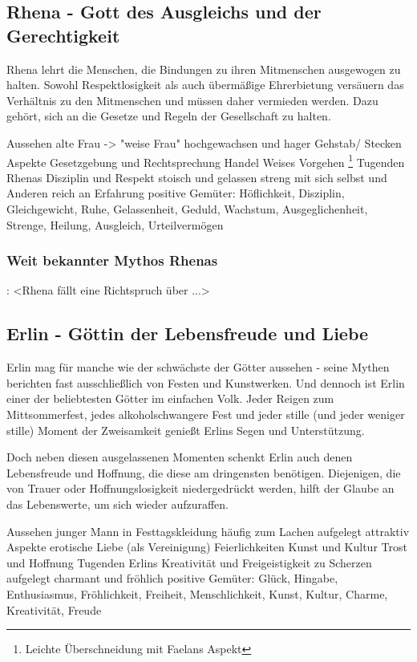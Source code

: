 \subsection{Rhena - Gott des Ausgleichs und der Gerechtigkeit}
Rhena lehrt die Menschen, die Bindungen zu ihren Mitmenschen ausgewogen zu halten. 
Sowohl Respektlosigkeit als auch übermäßige Ehrerbietung versäuern das Verhältnis zu den Mitmenschen und müssen daher vermieden werden. 
Dazu gehört, sich an die Gesetze und Regeln der Gesellschaft zu halten.
\begin{outline}
	\1 Aussehen 
		\2 alte Frau  -> "weise Frau"
		\2 hochgewachsen und hager
		\2 Gehstab/ Stecken
	\1 Aspekte
		\2 Gesetzgebung und Rechtsprechung
		\2 Handel
		\2 Weises Vorgehen \footnote{Leichte Überschneidung mit Faelans Aspekt}
	\1 Tugenden Rhenas
		\2 Disziplin und Respekt
		\2 stoisch und gelassen
		\2 streng mit sich selbst und Anderen
		\2 reich an Erfahrung
	\1 positive Gemüter: Höflichkeit, Disziplin, Gleichgewicht, Ruhe, Gelassenheit, Geduld, Wachstum, Ausgeglichenheit, Strenge, Heilung, Ausgleich, Urteilvermögen
\end{outline}

\subsubsection{Weit bekannter Mythos Rhenas}:
<Rhena fällt eine Richtspruch über ...>





\subsection{Erlin - Göttin der Lebensfreude und Liebe}
Erlin mag für manche wie der schwächste der Götter aussehen - seine Mythen berichten fast ausschließlich von Festen und Kunstwerken. 
Und dennoch ist Erlin einer der beliebtesten Götter im einfachen Volk. 
Jeder Reigen zum Mittsommerfest, jedes alkoholschwangere Fest und jeder stille (und jeder weniger stille) Moment der Zweisamkeit genießt Erlins Segen und Unterstützung.

Doch neben diesen ausgelassenen Momenten schenkt Erlin auch denen Lebensfreude und Hoffnung, die diese am dringensten benötigen. 
Diejenigen, die von Trauer oder Hoffnungslosigkeit niedergedrückt werden, hilft der Glaube an das Lebenswerte, um sich wieder aufzuraffen.
\begin{outline}
	\1 Aussehen 
		\2 junger Mann in Festtagskleidung
		\2 häufig zum Lachen aufgelegt
		\2 attraktiv 
	\1 Aspekte
		\2 erotische Liebe (als Vereinigung)
		\2 Feierlichkeiten
		\2 Kunst und Kultur
		\2 Trost und Hoffnung
	\1 Tugenden Erlins
		\2 Kreativität und Freigeistigkeit
		\2 zu Scherzen aufgelegt
		\2 charmant und fröhlich
	\1 positive Gemüter: Glück, Hingabe, Enthusiasmus, Fröhlichkeit, Freiheit, Menschlichkeit, Kunst, Kultur, Charme, Kreativität, Freude
\end{outline}

